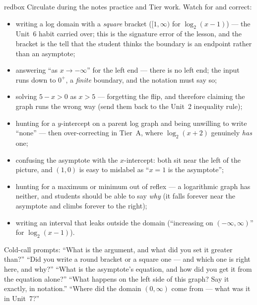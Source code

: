 \documentclass[10pt]{article}
\begin{document}
\begin{skillbox}{redbox}
Circulate during the notes practice and Tier work. Watch for and correct:
\begin{itemize}[leftmargin=1.2em, nosep]
  \item writing a log domain with a \emph{square} bracket ($[1,\infty)$ for $\log_2(x-1)$) --- the Unit~6 habit carried over; this is the signature error of the lesson, and the bracket is the tell that the student thinks the boundary is an endpoint rather than an asymptote;
  \item answering ``as $x\to-\infty$'' for the left end --- there is no left end; the input runs down to $0^{+}$, a \emph{finite} boundary, and the notation must say so;
  \item solving $5-x>0$ as $x>5$ --- forgetting the flip, and therefore claiming the graph runs the wrong way (send them back to the Unit~2 inequality rule);
  \item hunting for a $y$-intercept on a parent log graph and being unwilling to write ``none'' --- then over-correcting in Tier~A, where $\log_2(x+2)$ genuinely \emph{has} one;
  \item confusing the asymptote with the $x$-intercept: both sit near the left of the picture, and $(1,0)$ is easy to mislabel as ``$x=1$ is the asymptote'';
  \item hunting for a maximum or minimum out of reflex --- a logarithmic graph has neither, and students should be able to say \emph{why} (it falls forever near the asymptote and climbs forever to the right);
  \item writing an interval that leaks outside the domain (``increasing on $(-\infty,\infty)$'' for $\log_2(x-1)$).
\end{itemize}
Cold-call prompts: ``What is the argument, and what did you set it greater than?'' ``Did you write a
round bracket or a square one --- and which one is right here, and why?'' ``What is the asymptote's
equation, and how did you get it from the equation alone?'' ``What happens on the left side of this
graph? Say it exactly, in notation.'' ``Where did the domain $(0,\infty)$ come from --- what was it in
Unit~7?''
\end{skillbox}
\end{document}
